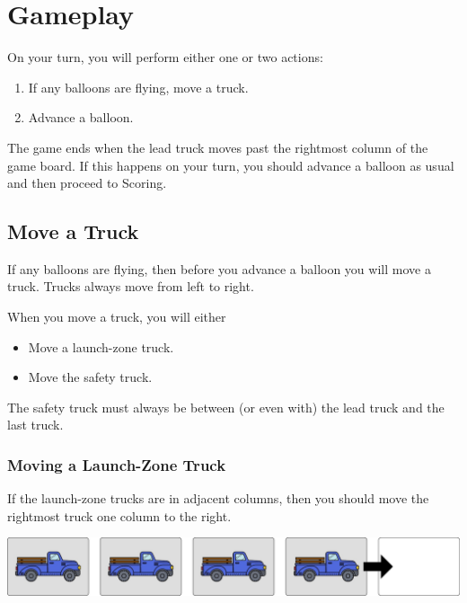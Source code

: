 \documentclass[a6paper, 11pt, parskip=half, DIV=15]{scrartcl}
\begin{document}
\newpage
\enlargethispage{1.75\baselineskip}
\section*{Gameplay}
On your turn, you will perform either one or two actions:
\begin{enumerate}[nosep]
  \item If any balloons are flying, move a truck.
  \item Advance a balloon.
\end{enumerate}

The game ends when the lead truck moves past the rightmost column of the game board. If this happens on your turn, you should advance a balloon as usual and then proceed to {\setmainfont{Fredoka-Bold} Scoring}.

\subsection*{Move a Truck}
If any balloons are flying, then before you advance a balloon you will move a truck. Trucks always move from left to right.

When you move a truck, you will either
\begin{itemize}[nosep]
  \item Move a launch-zone truck.
  \item Move the safety truck.
\end{itemize}

The safety truck must always be between (or even with) the lead truck and the last truck.

\subsubsection*{Moving a Launch-Zone Truck}
If the launch-zone trucks are in adjacent columns, then you should move the rightmost truck one column to the right.

\begin{center}
\includegraphics[scale=0.1]{wind_diagram_1.jpg}
\end{center}
\end{document}
